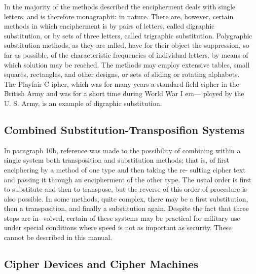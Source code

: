 \mypara In the majority of the methods described the encipherment deals
with single letters, and is therefore monagraphit: in nature. There are,
however, certain methods in which encipherment is by pairs of letters,
called digraphic substitution, or by sets of three letters, called trigraphic
substitution. Polygraphic substitution methods, as they are mlled, have
for their object the suppression, so far as possible, of the characteristic
frequencies of individual letters, by means of which solution may be
reached. The methods may employ extensive tables, small squares,
rectangles, and other designs, or sets of sliding or rotating alphabets.
The Playfair C ipher, which was for many years a standard ﬁeld cipher in
the British Army and was for a short time during World War I em—
ployed by the U. S. Army, is an example of digraphic substitution.

\subsection{Combined Substitution-Transposifion Systems}

In paragraph 10b, reference was made to the possibility of combining
within a single system both transposition and substitution methods; that
is, of ﬁrst enciphering by a method of one type and then taking the re-
sulting cipher text and passing it through an encipherment of the other
type. The usual order is ﬁrst to substitute and then to transpose, but
the reverse of this order of procedure is also possible. In some methods,
quite complex, there may be a ﬁrst substitution, then a transposition, and
ﬁnally a substitution again. Despite the fact that three steps are in-
volved, certain of these systems may be practical for military use under
special conditions where speed is not as important as security. These
cannot be described in this manual.

\subsection{Cipher Devices and Cipher Machines}

